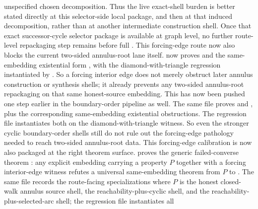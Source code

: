 \documentclass[11pt]{article}
\begin{document}
unspecified chosen decomposition.  Thus the live exact-shell burden is better
stated directly at this selector-side local package, and then at that induced
decomposition, rather than at another intermediate construction shell.  Once
that exact successor-cycle selector package is available at graph level, no
further route-level repackaging step remains before full
.
This forcing-edge route now also blocks the current two-sided annulus-root lane
itself.   now proves
and the same-embedding existential form
,
with the diamond-with-triangle regression instantiated by
.
So a forcing interior edge does not merely obstruct later annulus construction
or synthesis shells; it already prevents any two-sided annulus-root
repackaging on that same honest-source embedding.
This has now been pushed one step earlier in the boundary-order pipeline as
well.  The same file proves
and
,
plus the corresponding same-embedding existential obstructions.  The regression
file instantiates both on the diamond-with-triangle witness.  So even the
stronger cyclic boundary-order shells still do not rule out the forcing-edge
pathology needed to reach two-sided annulus-root data.
This forcing-edge calibration is now also packaged at the right theorem
surface.   proves the
generic failed-converse theorem
:
any explicit embedding carrying a property $P$ together with a forcing
interior-edge witness refutes a universal same-embedding theorem from $P$ to
.  The same file records the
route-facing specializations where $P$ is the honest closed-walk annulus
source shell, the reachability-plus-cyclic shell, and the
reachability-plus-selected-arc shell; the regression file instantiates all
\end{document}
